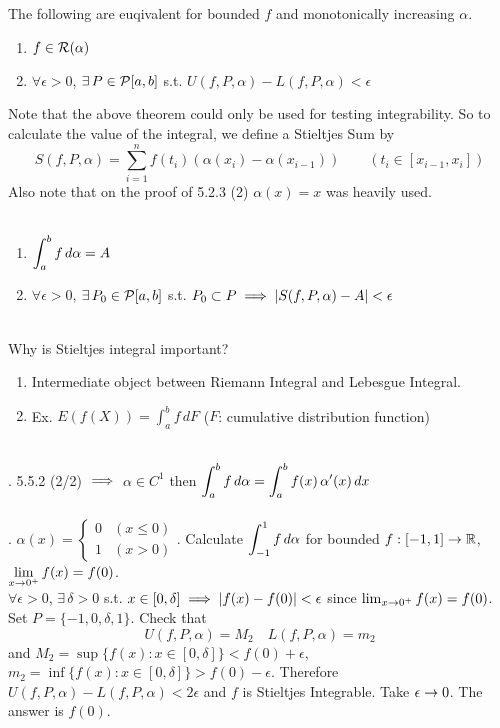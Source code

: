  The following are euqivalent for bounded $f$ and monotonically increasing $\alpha$.
\begin{enumerate}
	\item $f\in \mathcal{R}(\alpha)$
	\item $\forall\epsilon>0$, $\exists\,P\in \mathcal{P}[a, b]$ s.t. $U(f, P, \alpha) - L(f, P, \alpha) < \epsilon$
\end{enumerate}
Note that the above theorem could only be used for testing integrability. So to calculate the value of the integral, we define a Stieltjes Sum by
$$S(f, P, \alpha) = \sum_{i=1}^n f(t_i) (\alpha(x_i) - \alpha(x_{i-1})) \qquad (t_i \in [x_{i-1}, x_i])$$
Also note that on the proof of 5.2.3 (2) $\alpha(x) = x$ was heavily used.\\
\\
\begin{enumerate}
	\item $\displaystyle\int_a^b f\,d\alpha = A$
	\item $\forall\epsilon > 0$, $\exists \,P_0\in\mathcal{P}[a, b]$ s.t. $P_0\subset P \implies \left|S(f, P, \alpha) - A \right| < \epsilon$
\end{enumerate}~\\
Why is Stieltjes integral important?
\begin{enumerate}
	\item Intermediate object between Riemann Integral and Lebesgue Integral.
	\item Ex. $E(f(X)) = \int_a^b f \, dF$ ($F$: cumulative distribution function)
\end{enumerate}~\\
\rmk. 5.5.2 (2/2) $\implies$ $\alpha \in C^1$ then $\displaystyle \int_a^b f\,d\alpha = \int_a^b f(x)\,\alpha'(x)\,dx$\\
\\
\ex. $\alpha(x) = \begin{cases}
	0 & (x\leq 0) \\ 1 & (x > 0)
\end{cases}$. Calculate $\displaystyle \int_{-1}^1 f\, d\alpha$ for bounded $f:[-1, 1]\rightarrow\mathbb{R}$, $\displaystyle \lim_{x\rightarrow0^{+}} f(x) = f(0)$.\\
$\forall \epsilon > 0$, $\exists\,\delta > 0$ s.t. $x\in [0, \delta] \implies \left|f(x)-f(0)\right| < \epsilon$ since $\lim_{x\rightarrow0^{+}} f(x) = f(0)$.\\
Set $P = \{-1, 0, \delta, 1\}$. Check that
$$U(f, P, \alpha) = M_2 \quad L(f, P, \alpha) = m_2$$
and $M_2 = \sup\{f(x): x\in [0, \delta]\} < f(0) + \epsilon$, $m_2 = \inf\{f(x):x\in [0, \delta]\} > f(0) - \epsilon$. Therefore $U(f, P, \alpha) - L(f, P, \alpha) < 2\epsilon$ and $f$ is Stieltjes Integrable. Take $\epsilon\rightarrow0$. The answer is $f(0)$.\\\\
